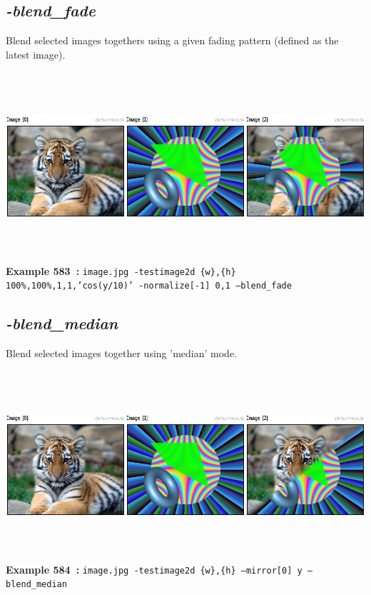 \documentclass[a4paper,11pt,twoside]{book}
\begin{document}
\subsection{\emph{-blend\_fade} }\vspace*{-0.5em}
Blend selected images togethers using a given fading pattern (defined as the latest image).
\begin{center}\includegraphics[keepaspectratio=true,height=7cm,width=\textwidth]{img/gmic_def583.jpg}\\
{\footnotesize \textbf{Example 583~:} \texttt{image.jpg -testimage2d \{w\},\{h\} 100\%,100\%,1,1,'cos(y/10)' -normalize[-1] 0,1 --blend\_fade}}
\end{center}

\subsection{\emph{-blend\_median} }\vspace*{-0.5em}
Blend selected images together using 'median' mode.
\begin{center}\includegraphics[keepaspectratio=true,height=7cm,width=\textwidth]{img/gmic_def584.jpg}\\
{\footnotesize \textbf{Example 584~:} \texttt{image.jpg -testimage2d \{w\},\{h\} --mirror[0] y --blend\_median}}
\end{center}
\end{document}
